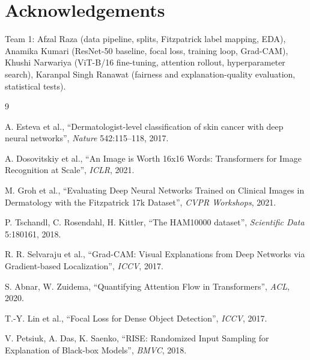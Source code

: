 \documentclass[twoside,a4paper,11pt]{article}
\begin{document}
\section*{Acknowledgements}

Team 1: Afzal Raza (data pipeline, splits, Fitzpatrick label mapping,
EDA), Anamika Kumari (ResNet-50 baseline, focal loss, training loop,
Grad-CAM), Khushi Narwariya (ViT-B/16 fine-tuning, attention rollout,
hyperparameter search), Karanpal Singh Ranawat (fairness and
explanation-quality evaluation, statistical tests).

\begin{thebibliography}{9}

A. Esteva et al., ``Dermatologist-level classification of skin cancer
with deep neural networks'', \emph{Nature} 542:115--118, 2017.

A. Dosovitskiy et al., ``An Image is Worth 16x16 Words: Transformers
for Image Recognition at Scale'', \emph{ICLR}, 2021.

M. Groh et al., ``Evaluating Deep Neural Networks Trained on Clinical
Images in Dermatology with the Fitzpatrick 17k Dataset'',
\emph{CVPR Workshops}, 2021.

P. Tschandl, C. Rosendahl, H. Kittler, ``The HAM10000 dataset'',
\emph{Scientific Data} 5:180161, 2018.

R. R. Selvaraju et al., ``Grad-CAM: Visual Explanations from Deep
Networks via Gradient-based Localization'', \emph{ICCV}, 2017.

S. Abnar, W. Zuidema, ``Quantifying Attention Flow in Transformers'',
\emph{ACL}, 2020.

T.-Y. Lin et al., ``Focal Loss for Dense Object Detection'',
\emph{ICCV}, 2017.

V. Petsiuk, A. Das, K. Saenko, ``RISE: Randomized Input Sampling for
Explanation of Black-box Models'', \emph{BMVC}, 2018.

\end{thebibliography}
\end{document}

